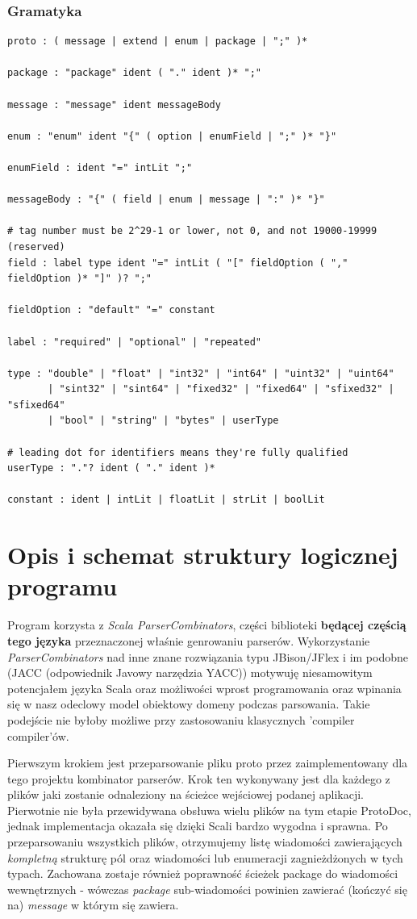 \documentclass[a4paper]{article}
\begin{document}
\subsubsection{Gramatyka}
\begin{verbatim}
proto : ( message | extend | enum | package | ";" )*

package : "package" ident ( "." ident )* ";"

message : "message" ident messageBody

enum : "enum" ident "{" ( option | enumField | ";" )* "}"

enumField : ident "=" intLit ";"

messageBody : "{" ( field | enum | message | ":" )* "}"

# tag number must be 2^29-1 or lower, not 0, and not 19000-19999 (reserved)
field : label type ident "=" intLit ( "[" fieldOption ( "," fieldOption )* "]" )? ";"

fieldOption : "default" "=" constant

label : "required" | "optional" | "repeated"

type : "double" | "float" | "int32" | "int64" | "uint32" | "uint64"
       | "sint32" | "sint64" | "fixed32" | "fixed64" | "sfixed32" | "sfixed64"
       | "bool" | "string" | "bytes" | userType

# leading dot for identifiers means they're fully qualified
userType : "."? ident ( "." ident )*

constant : ident | intLit | floatLit | strLit | boolLit
\end{verbatim}


\section{Opis i schemat struktury logicznej programu}
Program korzysta z \textit{Scala ParserCombinators}, części biblioteki \textbf{będącej częścią tego języka} przeznaczonej właśnie genrowaniu parserów.
Wykorzystanie \textit{ParserCombinators} nad inne znane rozwiązania typu JBison/JFlex i im podobne (JACC (odpowiednik Javowy narzędzia YACC)) motywuję
niesamowitym potencjałem języka Scala oraz możliwości wprost programowania oraz wpinania się w nasz odeclowy model obiektowy domeny podczas parsowania.
Takie podejście nie byłoby możliwe przy zastosowaniu klasycznych 'compiler compiler'ów.

Pierwszym krokiem jest przeparsowanie pliku proto przez zaimplementowany dla tego projektu kombinator parserów. Krok ten wykonywany 
jest dla każdego z plików jaki zostanie odnaleziony na ścieżce wejściowej podanej aplikacji. Pierwotnie nie była przewidywana obsłuwa wielu 
plików na tym etapie ProtoDoc, jednak implementacja okazała się dzięki Scali bardzo wygodna i sprawna. Po przeparsowaniu wszystkich plików, 
otrzymujemy listę wiadomości zawierających \textit{kompletną} strukturę pól oraz wiadomości lub enumeracji zagnieżdżonych w tych typach. 
Zachowana zostaje również poprawność ścieżek package do wiadomości wewnętrznych - wówczas \textit{package} sub-wiadomości powinien zawierać (kończyć się na) 
\textit{message} w którym się zawiera.
\end{document}
